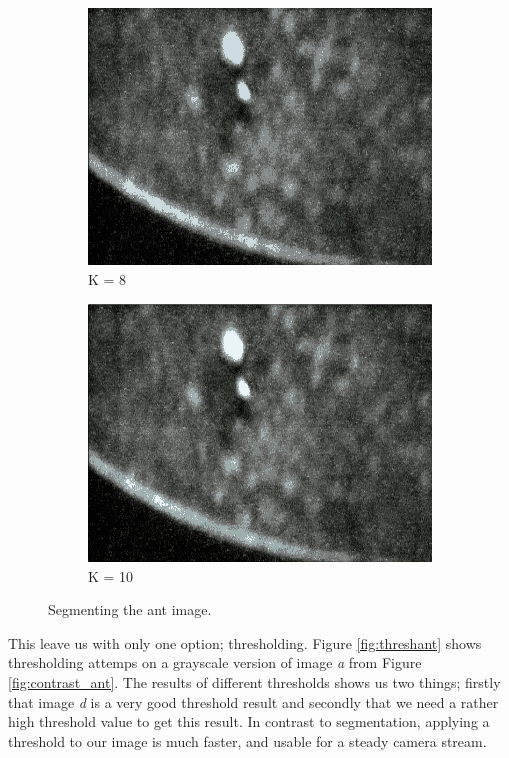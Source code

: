 \begin{figure}
\begin{subfigure}[b]{0.4\textwidth}
                \includegraphics[scale = 0.2]{img/segment8}
                \caption{K = 8}
        \end{subfigure}
		\quad
        \begin{subfigure}[b]{0.4\textwidth}
                \includegraphics[scale = 0.2]{img/segment10}
                \caption{K = 10}
        \end{subfigure}
		\caption{Segmenting the ant image.}
		\label{fig:segment_ant}
\end{figure}

This leave us with only one option; thresholding. Figure \ref{fig:threshant} shows thresholding attemps on a grayscale version of image \emph{a} from Figure \ref{fig:contrast_ant}. The results of different thresholds shows us two things; firstly that image \emph{d} is a very good threshold result and secondly that we need a rather high threshold value to get this result. In contrast to segmentation, applying a threshold to our image is much faster, and usable for a steady camera stream.\\

